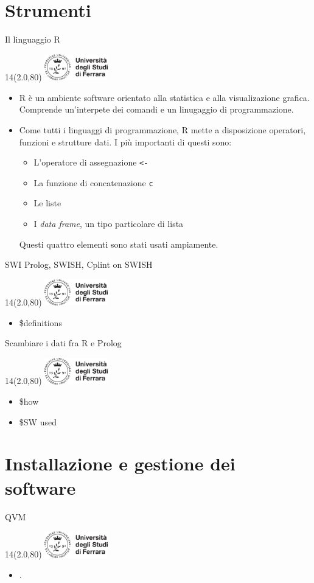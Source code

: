 \documentclass[11pt,xcolor={dvipsnames},default]{beamer} %
\newcommand{\MyLogo}{%
\begin{textblock}{14}(2.0,80)
 \includegraphics[height=1.15cm, angle=0]{logo}
\end{textblock}
}
\begin{document}
\section{Strumenti}
\begin{frame}{Il linguaggio R}
\transboxin
\MyLogo
\begin{itemize}
\item R è un ambiente software orientato alla statistica e alla visualizazione 
grafica. Comprende un'interpete dei comandi e un linugaggio di programmazione.
\item Come tutti i linguaggi di programmazione, R mette a disposizione 
operatori, funzioni e strutture dati. I più importanti di questi sono:
\begin{itemize}
\item L'operatore di assegnazione \texttt{<-}
\item La funzione di concatenazione \texttt{c}
\item Le liste
\item I \emph{data frame}, un tipo particolare di lista
\end{itemize}
Questi quattro elementi sono stati usati ampiamente.
\end{itemize}
\end{frame}

\begin{frame}{SWI Prolog, SWISH, Cplint on SWISH}
\transboxin
\MyLogo
\begin{itemize}
\item \$definitions
\end{itemize}
\end{frame}

\begin{frame}{Scambiare i dati fra R e Prolog}
\transboxin
\MyLogo
\begin{itemize}
\item \$how
\item \$SW used
\end{itemize}
\end{frame}

\section{Installazione e gestione dei software}
\begin{frame}{QVM}
\transboxin
\MyLogo
\begin{itemize}
\item .
\end{itemize}
\end{frame}
\end{document}
